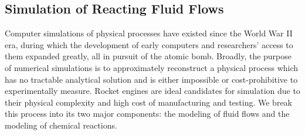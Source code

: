 \subsection{Simulation of Reacting Fluid Flows}

Computer simulations of physical processes have existed since the World War II era, during which the development of early computers and researchers' access to them expanded greatly, all in pursuit of the atomic bomb. Broadly, the purpose of numerical simulations is to approximately reconstruct a physical process which has no tractable analytical solution and is either impossible or cost-prohibitive to experimentally measure. Rocket engines are ideal candidates for simulation due to their physical complexity and high cost of manufacturing and testing. We break this process into its two major components: the modeling of fluid flows and the modeling of chemical reactions.

